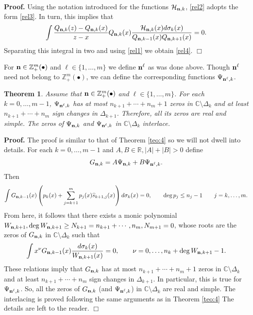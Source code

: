 \documentclass{amsart}
\newtheorem{teo}{\sc Theorem}[section]
\theoremstyle{definition}
\theoremstyle{remark}
\begin{document}
{\bf Proof.} Using the notation introduced for the functions $\mathcal{H}_{{\bf n},k}$, \eqref{rel2} adopts the form \eqref{rel3}.
In turn, this implies that
\[ \int \frac{Q_{{\bf n},k}(z)- Q_{{\bf n},k}(x)}{z-x} Q_{{\bf n},k}(x)\frac{\mathcal{H}_{{\bf
n},k}(x)d\sigma_k(x)}{Q_{{\bf n},k-1}(x) Q_{{\bf
n},k+1}(x)}=0.
\]
Separating this integral in two and using \eqref{rel1} we obtain \eqref{rel4}. \hfill $\Box$

\medskip

For ${\bf n} \in {\mathbb{Z}}_+^{m}(\bullet)$ and $\ell \in \{1,\ldots,m\}$ we define ${\bf n}^\ell$ as was done above. Though ${\bf n}^\ell$ need not belong to ${\mathbb{Z}}_+^{m}(\bullet)$, we can define the corresponding functions $\Psi_{{\bf n}^\ell,k}$.


\begin{teo} \label{teo:7} Assume that ${\bf n} \in {\mathbb{Z}}_+^{m}(\bullet)$ and $\ell \in \{1,\ldots,m\}$. For each $k=0,\ldots,m-1$,   ${\Psi}_{{\bf n}^\ell,k}$ has at most   $n_{k+1}+\cdots+n_m+1$ zeros in  ${\mathbb{C}} \setminus \Delta_{k}$ and at least $n_{k+1}+\cdots+n_m$ sign changes in $\Delta_{k+1}$. Therefore, all its zeros are real and simple. The zeros of ${\Psi}_{{\bf n},k}$ and ${\Psi}_{{\bf n}^\ell,k}$ in ${\mathbb{C}} \setminus \Delta_{k}$ interlace.
\end{teo}

{\bf Proof.} The proof is similar to that of Theorem \ref{teo:4} so we will not dwell into details. For each $k=0,\ldots,m-1$ and $A,B \in \mathbb{R}, |A| + |B| > 0$ define
\[ G_{{\bf n},k} = A \Psi_{{\bf n},k} + B \Psi_{{\bf n}^\ell,k}.
\]
Then
\[
\int G_{{\bf n},k-1}(x)\left(p_k(x) + \sum_{j=k+1}^m p_j(x) \widehat{s}_{k+1,j}(x)\right) d \sigma_k(x)  =0,\qquad
\deg p_j \leq n_j-1 \qquad j=k,\ldots,m.
\]
From here, it follows that there exists a monic polynomial $W_{{\bf n},k+1}, \deg W_{{\bf n},k+1} \geq N_{k+1} = n_{k+1} + \cdots, n_m, N_{m+1} = 0$,
whose roots are the zeros of $G_{{\bf n},k}$ in $\mathbb{C} \setminus \Delta_k$ such that
\[ \int  x^\nu  {G_{{\bf n},k-1}(x)} \frac{d\sigma_k(x)}{W_{{\bf n},k+1}(x)} = 0, \qquad \nu = 0,\ldots,n_k + \deg W_{{\bf n},k+1} -1.
\]
These relations imply that ${G}_{{\bf n},k}$ has at most   $n_{k+1}+\cdots+n_m+1$ zeros in  ${\mathbb{C}} \setminus \Delta_{k}$ and at least $n_{k+1}+\cdots+n_m$ sign changes in $\Delta_{k+1}$. In particular, this is true for $\Psi_{{\bf n}^\ell,k}$. So, all the zeros of ${G}_{{\bf n},k}$
(and $\Psi_{{\bf n}^\ell,k}$) in  ${\mathbb{C}} \setminus \Delta_{k}$ are real and simple. The interlacing is proved following the same arguments as in Theorem \ref{teo:4} The details are left to the reader. \hfill $\Box$
\end{document}
